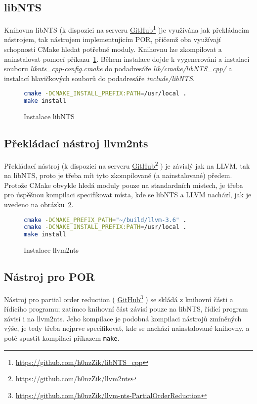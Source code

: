 \documentclass[12pt]{fithesis2}
\newcommand\fnurl[2]{%
  \href{#2}{#1}\footnote{\url{#2}}%
}
\begin{document}
\subsection{libNTS}
Knihovna libNTS (k dispozici na serveru
\fnurl{GitHub}{https://github.com/h0nzZik/libNTS_cpp})je využívána jak překládacím nástrojem, tak nástrojem implementujícím POR, přičemž oba využívají schopnosti CMake hledat potřebné moduly. Knihovnu lze zkompilovat a nainstalovat pomocí příkazu~\ref{fig:experiments:nts-install}. Během instalace dojde k vygenerování a instalaci souboru \textit{libnts\_cpp-config.cmake} do podadresáře \textit{lib/cmake/libNTS\_cpp/} a instalací hlavičkových souborů do podadresáře \textit{include/libNTS}.
\begin{figure}[h!]
\begin{lstlisting}[language=bash]
cmake -DCMAKE_INSTALL_PREFIX:PATH=/usr/local .
make install
\end{lstlisting}
\caption{Instalace libNTS}
\label{fig:experiments:nts-install}
\end{figure}

\subsection{Překládací nástroj llvm2nts}
Překládací nástroj (k dispozici na serveru
\fnurl{GitHub}{https://github.com/h0nzZik/llvm2nts}) je závislý jak na LLVM, tak na libNTS, proto je třeba mít tyto zkompilované (a nainstalované) předem. Protože CMake obvykle hledá moduly pouze na standardních místech, je třeba pro úspěšnou kompilaci specifikovat místa, kde se libNTS a LLVM nachází, jak je uvedeno na obrázku~\ref{fig:experiments:llvm2nts-install}.
\begin{figure}[h!]
\begin{lstlisting}[language=bash]
cmake -DCMAKE_PREFIX_PATH="~/build/llvm-3.6" .
cmake -DCMAKE_INSTALL_PREFIX:PATH=/usr/local .
make install
\end{lstlisting}
\caption{Instalace llvm2nts}
\label{fig:experiments:llvm2nts-install}
\end{figure}

\subsection{Nástroj pro POR}
Nástroj pro partial order reduction (
\fnurl{GitHub}{https://github.com/h0nzZik/llvm-nts-PartialOrderReduction}) se skládá z knihovní části a řídícího programu; zatímco knihovní část závisí pouze na libNTS, řídící program závisí i na llvm2nts. Jeho kompilace je podobná kompilaci nástrojů zmíněných výše, je tedy třeba nejprve specifikovat, kde se nachází nainstalované knihovny, a poté spustit kompilaci příkazem \verb+make+.
\end{document}
